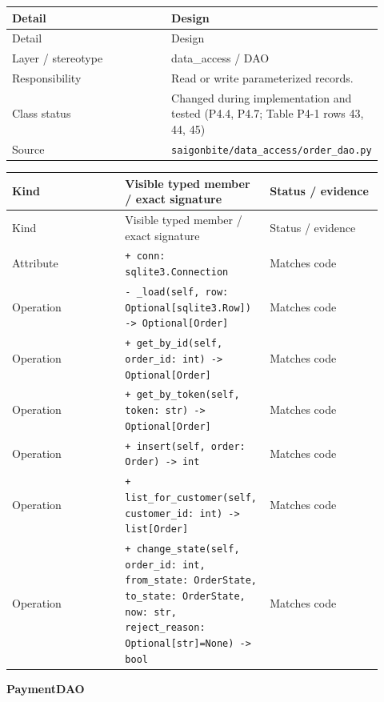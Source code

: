 \begin{longtable}{>{\raggedright\arraybackslash}p{0.4600\linewidth}>{\raggedright\arraybackslash}p{0.4600\linewidth}}
Detail & Design \\
\hline\endfirsthead
Detail & Design \\
\hline\endhead
Layer / stereotype & data\_access / \guillemotleft{}DAO\guillemotright{} \\
Responsibility & Read or write parameterized records. \\
Class status & Changed during implementation and tested (P4.4, P4.7; Table P4-1 rows 43, 44, 45) \\
Source & \texttt{saigonbite/\allowbreak{}data\_\allowbreak{}access/\allowbreak{}order\_\allowbreak{}dao.\allowbreak{}py} \\
\end{longtable}
\begin{longtable}{>{\raggedright\arraybackslash}p{0.3067\linewidth}>{\raggedright\arraybackslash}p{0.3067\linewidth}>{\raggedright\arraybackslash}p{0.3067\linewidth}}
Kind & Visible typed member / exact signature & Status / evidence \\
\hline\endfirsthead
Kind & Visible typed member / exact signature & Status / evidence \\
\hline\endhead
Attribute & \texttt{+ conn: sqlite3.\allowbreak{}Connection} & Matches code \\
Operation & \texttt{- \_\allowbreak{}load(self, row: Optional[sqlite3.\allowbreak{}Row]) -\textgreater{} Optional[Order]} & Matches code \\
Operation & \texttt{+ get\_\allowbreak{}by\_\allowbreak{}id(self, order\_\allowbreak{}id: int) -\textgreater{} Optional[Order]} & Matches code \\
Operation & \texttt{+ get\_\allowbreak{}by\_\allowbreak{}token(self, token: str) -\textgreater{} Optional[Order]} & Matches code \\
Operation & \texttt{+ insert(self, order: Order) -\textgreater{} int} & Matches code \\
Operation & \texttt{+ list\_\allowbreak{}for\_\allowbreak{}customer(self, customer\_\allowbreak{}id: int) -\textgreater{} list[Order]} & Matches code \\
Operation & \texttt{+ change\_\allowbreak{}state(self, order\_\allowbreak{}id: int, from\_\allowbreak{}state: OrderState, to\_\allowbreak{}state: OrderState, now: str, reject\_\allowbreak{}reason: Optional[str]=None) -\textgreater{} bool} & Matches code \\
\end{longtable}
\textbf{PaymentDAO}

